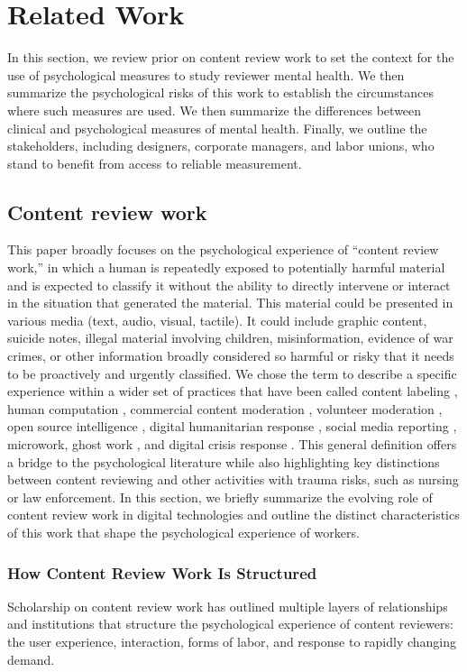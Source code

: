 \section{Related Work}
In this section, we review prior on content review work to set the context for the use of psychological measures to study reviewer mental health. We then summarize the psychological risks of this work to establish the circumstances where such measures are used. We then summarize the differences between clinical and psychological measures of mental health. Finally, we outline the stakeholders, including designers, corporate managers, and labor unions, who stand to benefit from access to reliable measurement.

\subsection{Content review work}
This paper broadly focuses on the psychological experience of ``content review work,'' in which a human is repeatedly exposed to potentially harmful material and is expected to classify it without the ability to directly intervene or interact in the situation that generated the material. This material could be presented in various media (text, audio, visual, tactile). It could include graphic content, suicide notes, illegal material involving children, misinformation, evidence of war crimes, or other information broadly considered so harmful or risky that it needs to be proactively and urgently classified. We chose the term to describe a specific experience within a wider set of practices that have been called content labeling \cite{morrow2022emerging}, human computation \cite{law_human_2011}, commercial content moderation \cite{roberts_behind_2019}, volunteer moderation \cite{matias_civic_2019}, open source intelligence \cite{fiorella_how_2022}, digital humanitarian response \cite{dubberley_making_2015}, social media reporting \cite{dubberley_finally_2020}, microwork, ghost work \cite{gray_ghost_2019}, and digital crisis response \cite{branson_when_2021}. This general definition offers a bridge to the psychological literature while also highlighting key distinctions between content reviewing and other activities with trauma risks, such as nursing or law enforcement. In this section, we briefly summarize the evolving role of content review work in digital technologies and outline the distinct characteristics of this work that shape the psychological experience of workers.

\subsubsection{How Content Review Work Is Structured}
Scholarship on content review work has outlined multiple layers of relationships and institutions that structure the psychological experience of content reviewers: the user experience, interaction, forms of labor, and response to rapidly changing demand.

